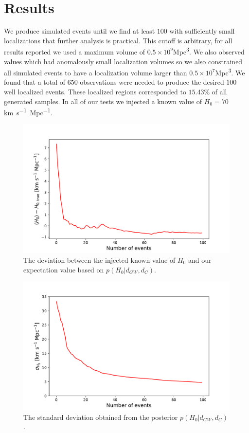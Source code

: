 \section{Results} \label{sec:conclusions}
We produce simulated events until we find at least $100$ with sufficiently small localizations that further analysis is practical.
This cutoff is arbitrary, for all results reported we used a maximum volume of $0.5\times 10^{9}$\si{Mpc^3}.
We also observed values which had anomalously small localization volumes so we also constrained all simulated events to have a localization volume larger than $0.5\times 10^{7}$\si{Mpc^3}.
We found that a total of $650$ observations were needed to produce the desired $100$ well localized events.
These localized regions corresponded to $15.43\%$ of all generated samples.
In all of our tests we injected a known value of $H_0=70$\si{km.s^{-1}.Mpc^{-1}}.

\begin{figure}
    \centering
    \includegraphics[width=0.9\columnwidth]{figures/diff.pdf}
    \caption{The deviation between the injected known value of $H_0$ and our expectation value based on $p(H_0 | d_{GW}, d_C)$.}
    \label{fig:mean_diff}
\end{figure}

\begin{figure}
    \centering
    \includegraphics[width=0.9\columnwidth]{figures/std.pdf}
    \caption{The standard deviation obtained from the posterior $p(H_0 | d_{GW}, d_C)$.}
    \label{fig:std}
\end{figure}

